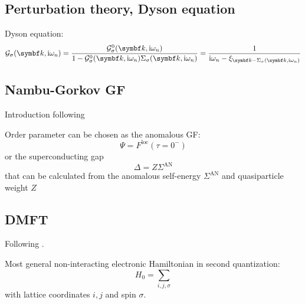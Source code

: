 \documentclass[../notes.tex]{subfiles}
\begin{document}

\subsection{Perturbation theory, Dyson equation}




Dyson equation:
\begin{equation}
	\mathcal{G}_{\sigma} (\vb{k}, \iu \omega_n) = \frac{\mathcal{G}_{\sigma}^0 (\vb{k}, \iu \omega_n)}{1 - \mathcal{G}_{\sigma}^0 (\vb{k}, \iu \omega_n) \Sigma_{\sigma} (\vb{k}, \iu \omega_n)} = \frac{1}{\iu \omega_n - \xi_{\vb{k} - \Sigma_{\sigma} (\vb{k}, \iu \omega_n)}}
\end{equation}


\subsection{Nambu-Gorkov GF}

Introduction following~\cite[ch. 14.7]{colemanIntroductionManyBodyPhysics2015}


Order parameter can be chosen as the anomalous GF:
\begin{equation}
	\Psi = F^{\mathrm{loc}} (\tau = 0^-)
\end{equation}
or the superconducting gap
\begin{equation}
	\Delta = Z \Sigma^{\mathrm{AN}}
\end{equation}
that can be calculated from the anomalous self-energy \(\Sigma^{\mathrm{AN}}\) and quasiparticle weight \(Z\)


\subsection{DMFT}

Following \cite{georgesDynamicalMeanfieldTheory1996}.

Most general non-interacting electronic Hamiltonian in second quantization:
\begin{equation}
	H_0 = \sum_{i, j, \sigma}
\end{equation}
with lattice coordinates \(i, j\) and spin \(\sigma\).
\end{document}
